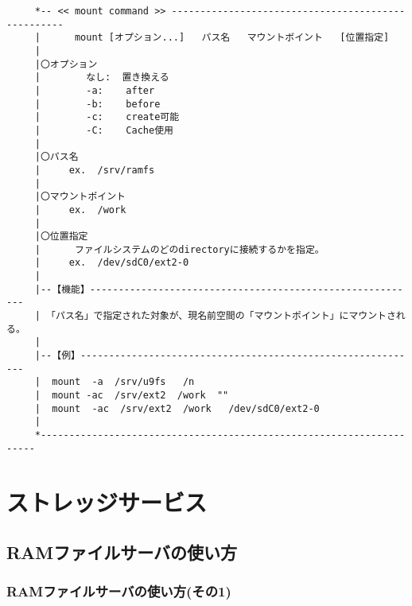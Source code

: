 \begin{verbatim}
     *-- << mount command >> ---------------------------------------------------
     |      mount [オプション...]   パス名   マウントボイント   [位置指定]    
     |
     |〇オプション                                                            
     |        なし:  置き換える                                               
     |        -a:    after                                                    
     |        -b:    before                                                   
     |        -c:    create可能                                               
     |        -C:    Cache使用                                                
     |
     |〇パス名                                                                
     |     ex.  /srv/ramfs                                                    
     |
     |〇マウントポイント                                                      
     |     ex.  /work                                                         
     |
     |〇位置指定                                                              
     |      ファイルシステムのどのdirectoryに接続するかを指定。               
     |     ex.  /dev/sdC0/ext2-0    
     |
     |--【機能】----------------------------------------------------------
     | 「パス名」で指定された対象が、現名前空間の「マウントポイント」にマウントされる。
     |                                                                                 
     |--【例】------------------------------------------------------------
     |  mount  -a  /srv/u9fs   /n                                                      
     |  mount -ac  /srv/ext2  /work  ""                                                
     |  mount  -ac  /srv/ext2  /work   /dev/sdC0/ext2-0                                
     |                                                                                 
     *---------------------------------------------------------------------
\end{verbatim}


\newpage
\part{ストレッジサービス}

\chapter{RAMファイルサーバの使い方}
\section{RAMファイルサーバの使い方(その1)}

